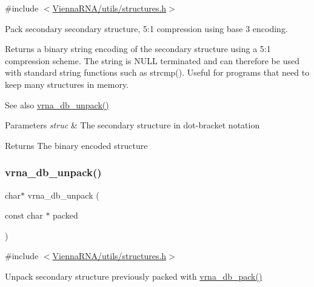 {\ttfamily \#include $<$\hyperlink{utils_2structures_8h}{Vienna\+R\+N\+A/utils/structures.\+h}$>$}



Pack secondary secondary structure, 5\+:1 compression using base 3 encoding. 

Returns a binary string encoding of the secondary structure using a 5\+:1 compression scheme. The string is N\+U\+LL terminated and can therefore be used with standard string functions such as strcmp(). Useful for programs that need to keep many structures in memory.

\begin{DoxySeeAlso}{See also}
\hyperlink{group__struct__utils__dot__bracket_ga6490adff857d84ce06e6f379ae3a4512}{vrna\+\_\+db\+\_\+unpack()} 
\end{DoxySeeAlso}

\begin{DoxyParams}{Parameters}
{\em struc} & The secondary structure in dot-\/bracket notation \\
\hline
\end{DoxyParams}
\begin{DoxyReturn}{Returns}
The binary encoded structure 
\end{DoxyReturn}
\mbox{\label{group__struct__utils__dot__bracket_ga6490adff857d84ce06e6f379ae3a4512}} 
\subsubsection{\texorpdfstring{vrna\+\_\+db\+\_\+unpack()}{vrna\_db\_unpack()}}
{\footnotesize\ttfamily char$\ast$ vrna\+\_\+db\+\_\+unpack (\begin{DoxyParamCaption}\item[{const char $\ast$}]{packed }\end{DoxyParamCaption})}



{\ttfamily \#include $<$\hyperlink{utils_2structures_8h}{Vienna\+R\+N\+A/utils/structures.\+h}$>$}



Unpack secondary structure previously packed with \hyperlink{group__struct__utils__dot__bracket_ga55c4783060a1464f862f858d5599c9e1}{vrna\+\_\+db\+\_\+pack()} 

